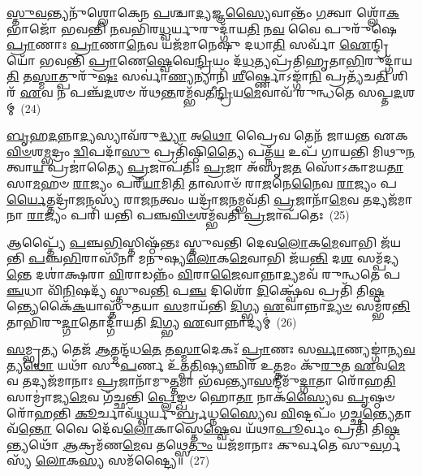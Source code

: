 \-\ul{𑌸𑍍𑌤𑍁}\-\-\ul{𑌵}\-𑌨𑍍𑌤𑍍𑌯𑌨𑍁᳴𑌶𑍍𑌲𑍋𑌕𑍇𑌨 \ul{𑌪}\-𑌶𑍍𑌚𑌾\-\ul{𑌦𑍍𑌯}\-𑌜𑍍𑌞\-\ul{𑌸𑍍𑌯𑍈}\-𑌵𑌾𑌨𑍍𑌤𑌂᳴ \ul{𑌗}\-𑌤𑍍𑌵𑌾 𑌶𑍍𑌲𑍋᳴\-\ul{𑌕}\-𑌭𑌾𑌜𑍋᳴ 𑌭𑌵𑌨𑍍𑌤𑌿 \ul{𑌨}\-𑌵𑌭𑌿᳴𑌰\-\ul{𑌧𑍍𑌵}\-𑌰𑍍𑌯𑍁𑌰𑍁𑌦𑍍𑌗𑌾᳴𑌯\-\ul{𑌤𑌿} 𑌨\-\ul{𑌵} 𑌵𑍈 𑌪𑍁𑌰𑍁᳴𑌷𑍇 \ul{𑌪𑍍𑌰𑌾}\-𑌣𑌾𑌃 \ul{𑌪𑍍𑌰𑌾}\-𑌣𑌾\-\ul{𑌨𑍇}\-𑌵 𑌯𑌜᳴𑌮𑌾𑌨𑍇𑌷𑍁 𑌦𑌧𑌾\-\ul{𑌤𑌿} 𑌸𑌰𑍍𑌵𑌾᳴ \ul{𑌐}\-𑌨𑍍𑌦𑍍𑌰𑌿𑌯𑍋᳴ 𑌭𑌵𑌨𑍍𑌤𑌿 \ul{𑌪𑍍𑌰𑌾}\-𑌣𑍇\-\ul{𑌷𑍍𑌵𑍇}\-𑌵𑍇\-\ul{𑌨𑍍𑌦𑍍𑌰𑌿}\-𑌯𑌂 𑌦᳴\-\ul{𑌧}\-𑌤𑍍𑌯𑌪𑍍𑌰᳴𑌤𑌿𑌹𑍃𑌤𑌾\-\ul{𑌭𑌿}\-𑌰𑍁𑌦𑍍𑌗𑌾᳴𑌯\-\ul{𑌤𑌿} 𑌤\-\ul{𑌸𑍍𑌮𑌾}\-𑌤𑍍𑌪𑍁𑌰𑍁᳴\-\ul{𑌷𑌃} 𑌸𑌰𑍍𑌵𑌾॑\-\ul{𑌣𑍍𑌯}\-𑌨𑍍𑌯𑌾𑌨𑌿᳴ \ul{𑌶𑍀}\-𑌰𑍍𑌷𑍍𑌣𑍋\-𑌽𑌙𑍍𑌗𑌾᳴\-\ul{𑌨𑌿} 𑌪𑍍𑌰𑌤𑍍𑌯᳴𑌚\-\ul{𑌤𑌿} 𑌶𑌿𑌰᳴ \ul{𑌏}\-𑌵 𑌨 𑌪𑌞𑍍𑌚᳴\-\ul{𑌦}\-𑌶𑍞 𑌰᳴𑌥\-\ul{𑌨𑍍𑌤}\-𑌰𑌮𑍍𑌭᳴𑌵𑌤𑍀\-\ul{𑌨𑍍𑌦𑍍𑌰𑌿}\-𑌯\-\ul{𑌮𑍇}\-𑌵𑌾𑌵᳴ 𑌰𑍁𑌨𑍍𑌧𑌤𑍇 𑌸𑌪𑍍𑌤\-\ul{𑌦}\-𑌶𑌮𑍍~(24)

\-\ul{𑌬𑍃}\-𑌹\-\ul{𑌦}\-𑌨𑍍𑌨𑌾\-\ul{𑌦𑍍𑌯}\-𑌸𑍍𑌯𑌾𑌵᳴𑌰𑍁\-\ul{𑌦𑍍𑌧𑍍𑌯𑌾} 𑌅\-\ul{𑌥𑍋} 𑌪𑍍𑌰𑍈𑌵 𑌤𑍇𑌨᳴ 𑌜𑌾𑌯𑌨𑍍𑌤 𑌏𑌕\-\ul{𑌵𑌿}\-\-\ul{𑍞}\-𑌶\-\ul{𑌮𑍍𑌭}\-𑌦𑍍𑌰𑌂 \ul{𑌦𑍍𑌵𑌿}\-𑌪𑌦𑌾᳴\-\ul{𑌸𑍁} 𑌪𑍍𑌰𑌤𑌿᳴𑌷𑍍𑌠𑌿\-\ul{𑌤𑍍𑌯𑍈} 𑌪𑌤𑍍𑌨᳴\-\ul{𑌯} 𑌉𑌪᳴ 𑌗𑌾𑌯𑌨𑍍𑌤𑌿 𑌮𑌿𑌥𑍁\-\ul{𑌨}\-𑌤𑍍𑌵𑌾\-\ul{𑌯} 𑌪𑍍𑌰𑌜𑌾॑𑌤𑍍𑌯𑍈 \ul{𑌪𑍍𑌰}\-𑌜𑌾𑌪᳴𑌤𑌿𑌃 \ul{𑌪𑍍𑌰}\-𑌜𑌾 𑌅᳴𑌸𑍃𑌜\-\ul{𑌤} 𑌸𑍋᳴\-𑌽𑌕𑌾𑌮𑌯\-\ul{𑌤𑌾}\-𑌸𑌾\-\ul{𑌮}\-𑌹𑍞 \ul{𑌰𑌾}\-𑌜𑍍𑌯𑌂 𑌪𑌰𑍀᳴\-\ul{𑌯𑌾}\-𑌮𑌿\-\ul{𑌤𑌿} 𑌤𑌾𑌸𑌾𑍞᳴ 𑌰𑌾\-\ul{𑌜}\-𑌨𑍇\-\ul{𑌨𑍈}\-𑌵 \ul{𑌰𑌾}\-𑌜𑍍𑌯𑌂 𑌪\-\ul{𑌰𑍍𑌯𑍈}\-𑌤𑍍𑌤𑌦𑍍𑌰𑌾᳴\-\ul{𑌜}\-𑌨𑌸𑍍𑌯᳴ 𑌰𑌾𑌜\-\ul{𑌨}\-𑌤𑍍𑌵𑌂 𑌯𑌦𑍍𑌰𑌾᳴\-\ul{𑌜}\-𑌨𑌮𑍍𑌭𑌵᳴𑌤𑌿 \ul{𑌪𑍍𑌰}\-𑌜𑌾𑌨𑌾᳴\-\ul{𑌮𑍇}\-𑌵 𑌤𑌦𑍍𑌯𑌜᳴𑌮𑌾𑌨𑌾 \ul{𑌰𑌾}\-𑌜𑍍𑌯𑌂 𑌪𑌰𑌿᳴ 𑌯𑌨𑍍𑌤𑌿 𑌪𑌞𑍍𑌚\-\ul{𑌵𑌿}\-\-\ul{𑍞}\-𑌶𑌮𑍍𑌭᳴𑌵𑌤𑌿 \ul{𑌪𑍍𑌰}\-𑌜𑌾𑌪᳴𑌤𑍇𑌃~(25)

𑌆𑌪𑍍𑌤𑍍𑌯𑍈᳴ \ul{𑌪}\-𑌞𑍍𑌚\-\ul{𑌭𑌿}\-𑌸𑍍𑌤𑌿𑌷𑍍𑌠᳴𑌨𑍍𑌤𑌃 𑌸𑍍𑌤𑍁𑌵𑌨𑍍𑌤𑌿 𑌦𑍇𑌵\-\ul{𑌲𑍋}\-𑌕\-\ul{𑌮𑍇}\-𑌵𑌾𑌭𑌿 𑌜᳴𑌯𑌨𑍍𑌤𑌿 \ul{𑌪}\-𑌞𑍍𑌚\-\ul{𑌭𑌿}\-𑌰𑌾𑌸𑍀᳴𑌨𑌾 𑌮𑌨𑍁𑌷𑍍𑌯\-\ul{𑌲𑍋}\-𑌕\-\ul{𑌮𑍇}\-𑌵𑌾𑌭𑌿 𑌜᳴𑌯\-\ul{𑌨𑍍𑌤𑌿} 𑌦\-\ul{𑌶} 𑌸𑌮𑍍𑌪᳴𑌦𑍍𑌯\-\ul{𑌨𑍍𑌤𑍇} 𑌦𑌶𑌾॑𑌕𑍍𑌷𑌰𑌾 \ul{𑌵𑌿}\-𑌰𑌾𑌡𑌨𑍍𑌨𑌂᳴ \ul{𑌵𑌿}\-𑌰𑌾\-\ul{𑌜𑍈}\-𑌵𑌾𑌨𑍍𑌨𑌾\-\ul{𑌦𑍍𑌯}\-𑌮𑌵᳴ 𑌰𑍁𑌨𑍍𑌧𑌤𑍇 𑌪\-\ul{𑌞𑍍𑌚}\-𑌧𑌾 𑌵𑌿᳴\-\ul{𑌨𑌿}\-𑌷𑌦𑍍𑌯᳴ 𑌸𑍍𑌤𑍁𑌵\-\ul{𑌨𑍍𑌤𑌿} 𑌪\-\ul{𑌞𑍍𑌚} 𑌦𑌿𑌶𑍋᳴ \ul{𑌦𑌿}\-𑌕𑍍𑌷𑍍𑌵𑍇᳴𑌵 𑌪𑍍𑌰𑌤𑌿᳴ 𑌤𑌿\-\ul{𑌷𑍍𑌠}\-𑌨𑍍𑌤𑍍𑌯𑍇𑌕𑍈᳴\-\ul{𑌕}\-𑌯𑌾𑌸𑍍𑌤𑍁᳴𑌤𑌯𑌾 \ul{𑌸}\-𑌮𑌾𑌯᳴𑌨𑍍𑌤𑌿 \ul{𑌦𑌿}\-𑌗𑍍𑌭𑍍𑌯 \ul{𑌏}\-𑌵𑌾𑌨𑍍𑌨𑌾\-\ul{𑌦𑍍𑌯}\-\-\ul{𑍞} 𑌸𑌮𑍍𑌭᳴𑌰\-\ul{𑌨𑍍𑌤𑌿} 𑌤𑌾𑌭𑌿᳴𑌰𑍁\-\ul{𑌦𑍍𑌗𑌾}\-𑌤𑍋𑌦𑍍𑌗𑌾᳴𑌯𑌤𑌿 \ul{𑌦𑌿}\-𑌗𑍍𑌭𑍍𑌯 \ul{𑌏}\-𑌵𑌾𑌨𑍍𑌨𑌾𑌦𑍍𑌯𑌮𑍍॑~(26)

\-\ul{𑌸}\-𑌮𑍍𑌭𑍃\-\ul{𑌤𑍍𑌯} 𑌤𑍇𑌜᳴ \ul{𑌆}\-𑌤𑍍𑌮𑌨𑍍𑌦᳴𑌧\-\ul{𑌤𑍇} 𑌤\-\ul{𑌸𑍍𑌮𑌾}\-𑌦𑍇𑌕𑌃᳴ \ul{𑌪𑍍𑌰𑌾}\-𑌣𑌃 𑌸\-\ul{𑌰𑍍𑌵𑌾}\-𑌣𑍍𑌯𑌙𑍍𑌗𑌾॑𑌨𑍍𑌯\-\ul{𑌵}\-𑌤𑍍𑌯\-\ul{𑌥𑍋} 𑌯𑌥𑌾᳴ 𑌸𑍁\-\ul{𑌪}\-𑌰𑍍𑌣 𑌉᳴𑌤𑍍𑌪\-\ul{𑌤𑌿}\-𑌷𑍍𑌯𑌞𑍍𑌛𑌿𑌰᳴ 𑌉\-\ul{𑌤𑍍𑌤}\-𑌮𑌂 𑌕𑍁᳴\-\ul{𑌰𑍁}\-𑌤 \ul{𑌏}\-𑌵\-\ul{𑌮𑍇}\-𑌵 𑌤𑌦𑍍𑌯𑌜᳴𑌮𑌾𑌨𑌾𑌃 \ul{𑌪𑍍𑌰}\-𑌜𑌾𑌨𑌾᳴𑌮𑍁\-\ul{𑌤𑍍𑌤}\-𑌮𑌾 𑌭᳴𑌵𑌨𑍍𑌤𑍍𑌯𑌾\-\ul{𑌸}\-𑌨𑍍𑌦𑍀𑌮𑍁᳴\-\ul{𑌦𑍍𑌗𑌾}\-𑌤𑌾 𑌰𑍋᳴𑌹\-\ul{𑌤𑌿} 𑌸𑌾𑌮𑍍𑌰𑌾॑𑌜𑍍𑌯\-\ul{𑌮𑍇}\-𑌵 𑌗᳴𑌚𑍍𑌛𑌨𑍍𑌤𑌿 \ul{𑌪𑍍𑌲𑍇}\-𑌙𑍍𑌖𑍞 𑌹𑍋\-\ul{𑌤𑌾} 𑌨𑌾𑌕᳴\-\ul{𑌸𑍍𑌯𑍈}\-𑌵 \ul{𑌪𑍃}\-𑌷𑍍𑌠𑍞 𑌰𑍋᳴𑌹𑌨𑍍𑌤𑌿 \ul{𑌕𑍂}\-𑌰𑍍𑌚𑌾𑌵᳴\-\ul{𑌧𑍍𑌵}\-𑌰𑍍𑌯𑍁\-\ul{𑌰𑍍𑌬𑍍𑌰}\-𑌧𑍍𑌨\-\ul{𑌸𑍍𑌯𑍈}\-𑌵 \ul{𑌵𑌿}\-𑌷𑍍𑌟𑌪𑌂᳴ 𑌗𑌚𑍍𑌛\-\ul{𑌨𑍍𑌤𑍍𑌯𑍇}\-𑌤𑌾𑌵᳴\-\ul{𑌨𑍍𑌤𑍋} 𑌵𑍈 𑌦𑍇᳴𑌵\-\ul{𑌲𑍋}\-𑌕𑌾𑌸𑍍𑌤𑍇\-\ul{𑌷𑍍𑌵𑍇}\-𑌵 𑌯᳴𑌥𑌾\-\ul{𑌪𑍂}\-𑌰𑍍𑌵𑌂 𑌪𑍍𑌰𑌤𑌿᳴ 𑌤𑌿\-\ul{𑌷𑍍𑌠}\-𑌨𑍍𑌤𑍍𑌯𑌥𑍋᳴ \ul{𑌆}\-𑌕𑍍𑌰𑌮᳴𑌣\-\ul{𑌮𑍇}\-𑌵 𑌤𑌥𑍍𑌸𑍇\-\ul{𑌤𑍁𑌂} 𑌯𑌜᳴𑌮𑌾𑌨𑌾𑌃 𑌕𑍁𑌰𑍍𑌵𑌤𑍇 𑌸𑍁\-\ul{𑌵}\-𑌰𑍍𑌗𑌸𑍍𑌯᳴ \ul{𑌲𑍋}\-𑌕\-\ul{𑌸𑍍𑌯} 𑌸𑌮᳴𑌷𑍍𑌟𑍍𑌯𑍈॥~(27)

